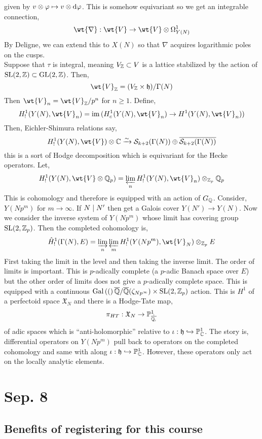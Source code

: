 \documentclass[12pt]{article}
\newcommand{\X}{\mathfrak{X}}
\begin{document}
given by $v \otimes \varphi \mapsto v \otimes \mathrm{d}{\varphi}$. This is somehow equivariant so we get an integrable connection,
\[ \wt{\nabla} : \wt{V} \to \wt{V} \ot \Omega^1_{Y(N)} \]
By Deligne, we can extend this to $X(N)$ so that $\nabla$ acquires logarithmic poles on the cusps. 
\bigskip\\
Suppose that $\tau$ is integral, meaning $V_{\mathbb{Z}} \subset V$ is a lattice stabilized by the action of $\mathrm{SL}(2, \mathbb{Z}) \subset \mathrm{GL}(2, \mathbb{Z})$. Then,
\[ \wt{V}_{\Z} = (V_\Z \times \h) / \Gamma(N) \]
Then $\wt{V}_n = \wt{V}_{\Z} / p^n$ for $n \ge 1$. Define,
\[ H^1_{!}(Y(N), \wt{V}_n) = \im{(H^1_c(Y(N), \wt{V}_n) \to H^1(Y(N), \wt{V}_n))} \]
Then, Eichler-Shimura relations say,
\[ H^1_{!}(Y(N), \wt{V}) \ot \C \iso \cS_{k+2}(\Gamma(N)) \oplus \overline{\cS_{k+2}(\Gamma(N))} \]
this is a sort of Hodge decomposition which is equivariant for the Hecke operators. Let,
\[ H^1_{!}(Y(N), \wt{V} \ot \Q_p) = \varprojlim_n H^1_{!}(Y(N), \wt{V}_n) \ot_{\Z_p} \Q_p \]
This is \etale cohomology and therefore is equipped with an action of $G_{\mathbb{Q}}$. Consider, $Y(N p^m)$ for $m \to \infty$. If $N \mid N'$ then get a Galois cover $Y(N') \to Y(N)$. Now we consider the inverse system of $Y(N p^m)$ whose limit has covering group $\mathrm{SL}(2, \mathbb{Z}_p)$. Then the completed cohomology is,
\[ \hat{H}^1_{!}(\Gamma(N), E) = \varinjlim_n \varprojlim_m H^1_{!}(Y(N p^m), \wt{V}_N) \ot_{\Z_p} E \]
First taking the limit in the level and then taking the inverse limit. The order of limits is important. This is $p$-adically complete (a $p$-adic Banach space over $E$) but the other order of limits does not give a $p$-adically complete space. This is equipped with a continuous $\mathrm{Gal}\left( ( \right)\overline{\mathbb{Q}} / \overline{\mathbb{Q}}(\zeta_{N p^\infty}) \times \mathrm{SL}(2, \mathbb{Z}_p)$ action. This is $H^1$ of a perfectoid space $\X_N$ and there is a Hodge-Tate map,
\[ \pi_{HT} : \X_N \to \P^1_{\hat{\overline{\Q_p}}} \]
of adic spaces which is ``anti-holomorphic'' relative to $\iota : \mathfrak{h} \hookrightarrow \mathbb{P}^1_{\mathbb{C}}$. The story is, differential operators on $Y(N p^m)$ pull back to operators on the completed cohomology and same with along $\iota : \mathfrak{h} \hookrightarrow \mathbb{P}^1_{\mathbb{C}}$. However, these operators only act on the locally analytic elements. 

\section{Sep. 8}

\subsection{Benefits of registering for this course}
\end{document}
